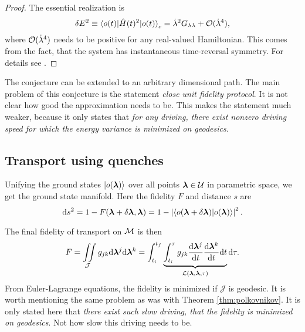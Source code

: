 \begin{proof}
    The essential realization is
    \begin{equation}
        \delta E^2\equiv \braket{o(t)|\hat{H}(t)^2|o(t)}_c=\dot\lambda^2 G_{\lambda\lambda}+\mathcal{O}(\dot\lambda^4),
    \end{equation}
    where $\mathcal{O}(\dot\lambda^4)$ needs to be positive for any real-valued Hamiltonian. This comes from the fact, that the system has instantaneous time-reversal symmetry. For details see \cite{Bukov2019}.
\end{proof}

The conjecture can be extended to an arbitrary dimensional path. The main problem of this conjecture is the statement \emph{close unit fidelity protocol}. It is not clear how good the approximation needs to be. This makes the statement much weaker, because it only states that \emph{for any driving, there exist nonzero driving speed for which the energy variance is minimized on geodesics.}









\subsection{Transport using quenches}
\label{sec:quenches}
Unifying the ground states $\ket{o({\bm\lambda})}$ over all points ${\bm\lambda}\in\mathcal U$ in parametric space, we get the ground state manifold. Here the fidelity $F$ and distance $s$ are
\begin{equation}
    \mathrm{d} s^2 = 1-F({\bm\lambda}+\delta{\bm\lambda},{\bm\lambda}) = 1-\left|\braket{o(\bm{{\bm\lambda}}+\delta\bm{{\bm\lambda}})|o(\bm{{\bm\lambda}})}\right|^2.
    \label{eq:distanceOnM0_1}
\end{equation}

The final fidelity of transport on $\mathcal{M}$ is then
\begin{equation}
    F=\iint\limits_{\mathcal J} g_{jk}\mathrm{d}{\bm\lambda}^j\mathrm{d}{\bm\lambda}^k = \int_{t_i}^{t_f}\underbrace{\int_{t_i}^\tau g_{jk}\frac{\mathrm{d} {\bm\lambda}^j}{\mathrm{d} t}\frac{\mathrm{d} {\bm\lambda}^k}{\mathrm{d} t} \mathrm{d} t}_{\mathcal{L}({\bm\lambda},\dot{{\bm\lambda}},\tau)}\mathrm{d} \tau .
\end{equation}
From Euler-Lagrange equations, the fidelity is minimized if $\mathcal J$ is geodesic. It is worth mentioning the same problem as was with Theorem \ref{thm:polkovnikov}. It is only stated here that \emph{there exist such slow driving, that the fidelity is minimized on geodesics}. Not how slow this driving needs to be. 

